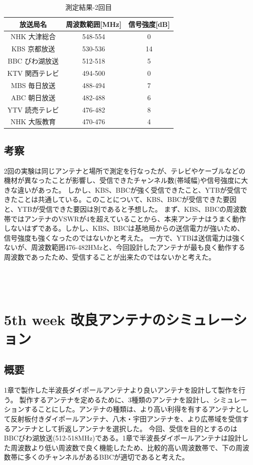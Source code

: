 \documentclass[dvipdfmx,autodetect-engine,titlepage]{jsarticle}
\begin{document}
  \begin{table}[H]
    \centering
    \caption{測定結果-2回目}\label{fig:表2}
    \begin{tabular}{|c|c|c|}
    \hline
    放送局名       & 周波数範囲{[}MHz{]} & 信号強度{[}dB{]} \\ \hline
    NHK 大津総合   & 548-554        & 0            \\ \hline
    KBS 京都放送   & 530-536        & 14            \\\hline
    BBC  びわ湖放送 & 512-518        & 5            \\\hline
    KTV 関西テレビ  & 494-500        & 0            \\\hline
    MBS 毎日放送   & 488-494        & 7            \\\hline
    ABC 朝日放送   & 482-488        & 6            \\\hline
    YTV 読売テレビ  & 476-482        & 8            \\\hline
    NHK 大阪教育   & 470-476        & 4            \\ \hline
    \end{tabular}
    \end{table}

\subsection{考察}
2回の実験は同じアンテナと場所で測定を行なったが、テレビやケーブルなどの機材が異なったことが影響し、受信できたチャンネル数(帯域幅)や信号強度に大きな違いがあった。
しかし、KBS、BBCが強く受信できたこと、YTBが受信できたことは共通している。このことについて、KBS、BBCが受信できた要因と、YTBが受信できた要因は別であると予想した。
まず、KBS、BBCの周波数帯ではアンテナのVSWRが4を超えていることから、本来アンテナはうまく動作しないはずである。しかし、KBS、BBCは基地局からの送信電力が強いため、信号強度も強くなったのではないかと考えた。
一方で、YTBは送信電力は強くないが、周波数範囲476-482HMzと、今回設計したアンテナが最も良く動作する周波数であったため、受信することが出来たのではないかと考えた。\\\\\\\\

\section{5th week 改良アンテナのシミュレーション}
\subsection{概要}
1章で製作した半波長ダイポールアンテナより良いアンテナを設計して製作を行う。
製作するアンテナを定めるために、3種類のアンテナを設計し、シミュレーションすることにした。アンテナの種類は、より高い利得を有するアンテナとして反射板付きダイポールアンテナ、八木・宇田アンテナを、より広帯域を受信するアンテナとして折返しアンテナを選択した。
今回、受信を目的とするのはBBCびわ湖放送(512-518MHz)である。1章で半波長ダイポールアンテナは設計した周波数より低い周波数で良く機能したため、比較的高い周波数帯で、下の周波数帯に多くのチャンネルがあるBBCが適切であると考えた。\\
\end{document}
